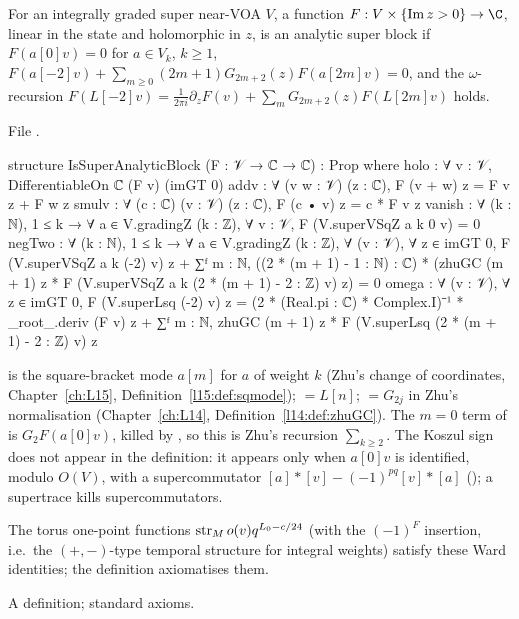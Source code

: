 \begin{definition}\label{l17:def:superblock}
For an integrally graded super near-VOA $V$, a function $F:V\times\{\operatorname{Im}z>0\}\to\C$, linear
in the state and holomorphic in $z$, is an analytic super block if $F(a[0]v)=0$ for $a\in V_k$, $k\ge1$,
$F(a[-2]v)+\sum_{m\ge0}(2m+1)G_{2m+2}(z)F(a[2m]v)=0$, and the $\omega$-recursion
$F(L[-2]v)=\frac1{2\pi i}\partial_zF(v)+\sum_mG_{2m+2}(z)F(L[2m]v)$ holds.
\end{definition}
\noindent File .
\begin{leancode}
structure IsSuperAnalyticBlock (F : 𝒱 → ℂ → ℂ) : Prop where
  holo : ∀ v : 𝒱, DifferentiableOn ℂ (F v) (imGT 0)
  addv : ∀ (v w : 𝒱) (z : ℂ), F (v + w) z = F v z + F w z
  smulv : ∀ (c : ℂ) (v : 𝒱) (z : ℂ), F (c • v) z = c * F v z
  vanish : ∀ (k : ℕ), 1 ≤ k → ∀ a ∈ V.gradingZ (k : ℤ), ∀ v : 𝒱,
    F (V.superVSqZ a k 0 v) = 0
  negTwo : ∀ (k : ℕ), 1 ≤ k → ∀ a ∈ V.gradingZ (k : ℤ), ∀ (v : 𝒱), ∀ z ∈ imGT 0,
    F (V.superVSqZ a k (-2) v) z
      + ∑ᶠ m : ℕ, ((2 * (m + 1) - 1 : ℕ) : ℂ)
          * (zhuGC (m + 1) z
            * F (V.superVSqZ a k (2 * (m + 1) - 2 : ℤ) v) z) = 0
  omega : ∀ (v : 𝒱), ∀ z ∈ imGT 0,
    F (V.superLsq (-2) v) z
      = (2 * (Real.pi : ℂ) * Complex.I)⁻¹ * _root_.deriv (F v) z
        + ∑ᶠ m : ℕ, zhuGC (m + 1) z
            * F (V.superLsq (2 * (m + 1) - 2 : ℤ) v) z
\end{leancode}
\begin{dictionary}
 is the square-bracket mode $a[m]$ for $a$ of weight $k$ (Zhu's change of
coordinates, Chapter~\ref{ch:L15}, Definition~\ref{l15:def:sqmode});  $=L[n]$;
 $=G_{2j}$ in Zhu's normalisation (Chapter~\ref{ch:L14}, Definition~\ref{l14:def:zhuGC}).
The $m=0$ term of  is $G_2F(a[0]v)$, killed by , so this is Zhu's recursion
$\sum_{k\ge2}$. The Koszul sign does not appear in the definition: it appears only when $a[0]v$ is
identified, modulo $O(V)$, with a supercommutator $[a]\ast[v]-(-1)^{pq}[v]\ast[a]$
(); a supertrace kills supercommutators.
\end{dictionary}
\begin{physics}
The torus one-point functions $\operatorname{str}_Mo(v)q^{L_0-c/24}$ (with the $(-1)^F$ insertion, i.e.\ the
$(+,-)$-type temporal structure for integral weights) satisfy these Ward identities; the definition
axiomatises them.
\end{physics}
\begin{status}
A definition; standard axioms.
\end{status}

